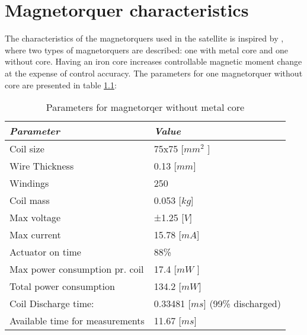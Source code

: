 \chapter{Magnetorquer characteristics} \label{chap:F}
The characteristics of the magnetorquers used in the satellite is inspired by \cite{TH}, where two types of magnetorquers are described: one with metal core and one without core. Having an iron core increases controllable magnetic moment change at the expense of control accuracy.  The parameters for one magnetorquer without core are presented in table \ref{table:for}:

\begin{table}[H]
	\centering
	\begin{tabular}{|l|l|}
		\hline
		\textit{\textbf{Parameter}}     & \textit{\textbf{Value}}                     				     \\ \hline
		Coil size                       		   & 75x75 {[}$mm^2$ {]}                      					  \\ \hline
		Wire Thickness                      & 0.13 {[}$mm${]}                             					 	\\ \hline
		Windings                        		& 250                                          						     	 \\ \hline
		Coil mass                     		    & 0.053 [$kg$]                                    					    \\ \hline
		Max voltage                  	      & ±1.25 {[}$V${]}  		\\ \hline
		Max current                  	      & 15.78 {[}$mA${]}                               						   \\ \hline
		Actuator on time                   & 88\%                                      				                        \\ \hline
		Max power consumption pr. coil  & 17.4 {[}$mW$ {]}                            					     \\ \hline
		Total power consumption     & 134.2 {[}$mW${]}                           	  					   	    \\ \hline
		Coil Discharge time:             & 0.33481 {[}$ms${]} (99\% discharged)   					     \\ \hline
		Available time for measurements & 11.67 {[}$ms${]}                               					     \\ \hline
	\end{tabular}
	\caption{Parameters for magnetorqer without metal core}
	\label{table:for}
\end{table}

